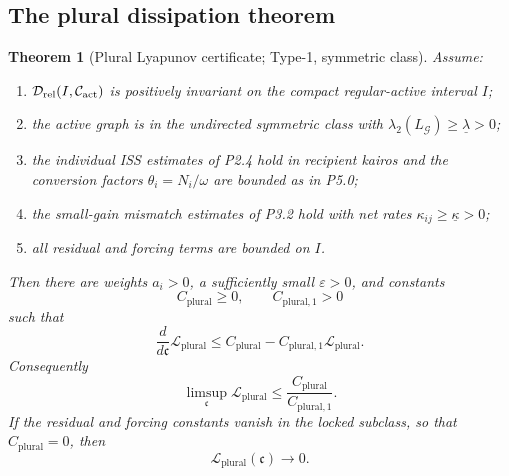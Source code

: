 \documentclass[11pt,a4paper]{article}
\theoremstyle{definition}
\theoremstyle{plain}
\newtheorem{theorem}[definition]{Theorem}
\theoremstyle{remark}
\begin{document}
\subsection{The plural dissipation theorem}

\begin{theorem}[Plural Lyapunov certificate; Type-1, symmetric class]\label{thm:plural-lyap}
Assume:
\begin{enumerate}[label=\textup{(\roman*)},leftmargin=1.2cm]
\item \(\mathcal D_{\mathrm{rel}}(I,\mathcal C_{\rm act})\) is positively invariant
on the compact regular-active interval \(I\);
\item the active graph is in the undirected symmetric class with
\(\lambda_2(L_{\mathcal G})\ge\underline\lambda>0\);
\item the individual ISS estimates of P2.4 hold in recipient kairos and the
conversion factors \(\theta_i=N_i/\omega\) are bounded as in P5.0;
\item the small-gain mismatch estimates of P3.2 hold with net rates
\(\kappa_{ij}\ge\underline\kappa>0\);
\item all residual and forcing terms are bounded on \(I\).
\end{enumerate}
Then there are weights \(a_i>0\), a sufficiently small \(\varepsilon>0\), and
constants
\[
C_{\mathrm{plural}}\ge0,
\qquad
C_{\mathrm{plural},1}>0
\]
such that
\[
\boxed{\;
\frac{d}{d\mathfrak c}\mathcal L_{\mathrm{plural}}
\le
C_{\mathrm{plural}}
-
C_{\mathrm{plural},1}\mathcal L_{\mathrm{plural}}.
\;}
\]
Consequently
\[
\limsup_{\mathfrak c}
\mathcal L_{\mathrm{plural}}
\le
\frac{C_{\mathrm{plural}}}{C_{\mathrm{plural},1}}.
\]
If the residual and forcing constants vanish in the locked subclass, so that
\(C_{\mathrm{plural}}=0\), then
\[
\mathcal L_{\mathrm{plural}}(\mathfrak c)\to0.
\]
\end{theorem}
\end{document}
